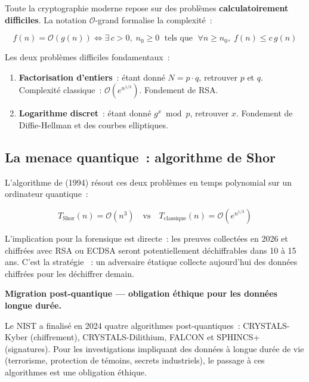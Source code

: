 Toute la cryptographie moderne repose sur des problèmes
\textbf{calculatoirement difficiles}. La notation $\mathcal{O}$-grand
formalise la complexité~:

\begin{equation}
f(n) = \mathcal{O}(g(n)) \iff
\exists\, c > 0,\; n_0 \geq 0 \;\text{ tels que }\;
\forall n \geq n_0,\; f(n) \leq c\,g(n)
\label{eq:big-O}
\end{equation}

Les deux problèmes difficiles fondamentaux~:
\begin{enumerate}
    \item \textbf{Factorisation d'entiers}~: étant donné $N = p \cdot q$,
          retrouver $p$ et $q$. Complexité classique~:
          $\mathcal{O}(e^{n^{1/3}})$. Fondement de RSA.
    \item \textbf{Logarithme discret}~: étant donné $g^x \bmod p$,
          retrouver $x$. Fondement de Diffie-Hellman et des courbes
          elliptiques.
\end{enumerate}

\subsection{La menace quantique~: algorithme de Shor}

L'algorithme de  (1994) résout
ces deux problèmes en temps polynomial sur un ordinateur quantique~:

\begin{equation}
T_{\text{Shor}}(n) = \mathcal{O}(n^3)
\quad \text{vs} \quad
T_{\text{classique}}(n) = \mathcal{O}(e^{n^{1/3}})
\label{eq:shor}
\end{equation}

L'implication pour la forensique est directe~: les preuves collectées en 2026
et chiffrées avec RSA ou ECDSA seront potentiellement déchiffrables dans
10 à 15 ans. C'est la stratégie
~:
un adversaire étatique collecte aujourd'hui des données chiffrées pour les
déchiffrer demain.

\begin{boxalert}
\textbf{Migration post-quantique --- obligation éthique pour les données
longue durée.}

Le NIST a finalisé en 2024 quatre algorithmes post-quantiques~:
CRYSTALS-Kyber (chiffrement), CRYSTALS-Dilithium, FALCON et SPHINCS+
(signatures). Pour les investigations impliquant des données à longue
durée de vie (terrorisme, protection de témoins, secrets industriels),
le passage à ces algorithmes est une obligation éthique.
\end{boxalert}

